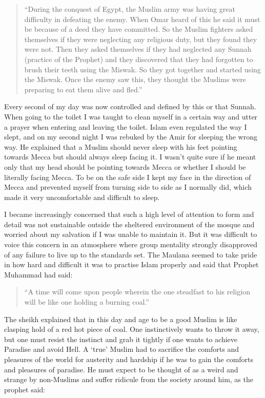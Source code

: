 \documentclass[12pt]{memoir}
\newcommand{\cmt}[2]{#1} %
\begin{document}
\begin{quote}
“During the conquest of Egypt,
the Muslim army was having great difficulty in defeating the enemy.
When Omar heard of this he said it must be
because of a deed they have committed.
So the Muslim fighters asked themselves
if they were neglecting any religious duty, but they found they were not.
Then they asked themselves if they had neglected any Sunnah
(practice of the Prophet) and they discovered
that they had forgotten to brush their teeth using the Miswak.
So they got together and started using the Miswak.
Once the enemy saw this,
they thought the Muslims were preparing to eat them alive and fled.”
\end{quote}

Every second of my day was now controlled and defined by this or that Sunnah.
When going to the toilet I was taught to clean myself in a certain way
and utter a prayer when entering and leaving the toilet.
Islam even regulated the way I slept,
and on my second night I was rebuked by the Amir for sleeping the wrong way.
He explained that a Muslim should never sleep with his feet pointing
towards Mecca but should always sleep facing it.
I wasn’t quite sure if he meant only that my head should be pointing
towards Mecca or whether I should be literally facing Mecca.
To be on the safe side I kept my face in the direction of Mecca
and prevented myself from turning side to side as I normally did,
which made it very uncomfortable and difficult to sleep.

I became increasingly concerned that such a high level of attention to form
and detail was not sustainable outside the sheltered environment of the mosque
and worried about my salvation if I was unable to maintain it.
But it was difficult to voice this concern in an atmosphere
where group mentality strongly disapproved of any failure
to live up to the standards set.
The Maulana seemed to take pride in how hard and difficult it was
to practise Islam properly and said that Prophet Muhammad had said:

\begin{quote}
“A time will come upon people wherein the one steadfast
to his religion will be like one holding a burning coal.”
\end{quote}

The sheikh explained that in this day and age to be a good Muslim
is like clasping hold of a red hot piece of coal.
One instinctively wants to throw it away,
but one must resist the instinct and grab it tightly
if one wants to achieve Paradise and avoid Hell.
A ‘true’ Muslim had to sacrifice the comforts
and pleasures of the world for austerity
and hardship if he was to gain the comforts and pleasures of paradise.
He must expect to be thought of as \cmt{a}{"thought of as weird"} weird
and strange by non-Muslims and suffer ridicule from the society around him,
as the prophet said:
\end{document}
